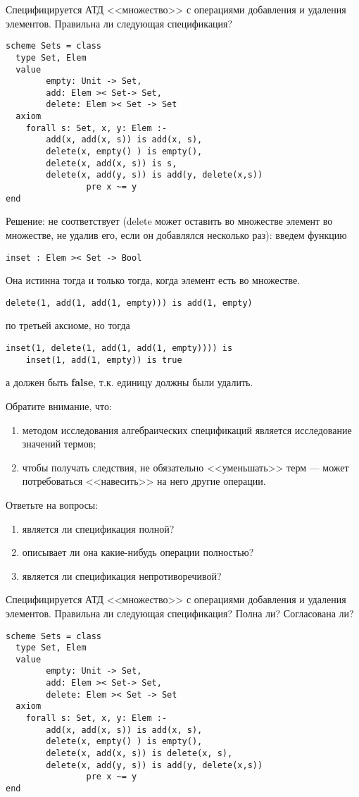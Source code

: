 

\z Специфицируется АТД <<множество>> с операциями добавления и удаления элементов. Правильна ли следующая спецификация?
\begin{lstlisting}
scheme Sets = class
  type Set, Elem
  value
        empty: Unit -> Set,
        add: Elem >< Set-> Set,
        delete: Elem >< Set -> Set
  axiom
    forall s: Set, x, y: Elem :-
        add(x, add(x, s)) is add(x, s),
        delete(x, empty() ) is empty(),
        delete(x, add(x, s)) is s,
        delete(x, add(y, s)) is add(y, delete(x,s))
                pre x ~= y
end
\end{lstlisting}

Решение: не соответствует (delete может оставить во множестве элемент во множестве, не удалив его, если он добавлялся несколько раз): введем функцию
\begin{lstlisting}
inset : Elem >< Set -> Bool
\end{lstlisting}
Она истинна тогда и только тогда, когда элемент есть во множестве.
\begin{lstlisting}
delete(1, add(1, add(1, empty))) is add(1, empty)
\end{lstlisting} по третьей аксиоме, но тогда
\begin{lstlisting}
inset(1, delete(1, add(1, add(1, empty)))) is
    inset(1, add(1, empty)) is true
\end{lstlisting}
а должен быть \textbf{false}, т.к. единицу должны были удалить.

Обратите внимание, что:
\begin{enumerate}
  \item методом исследования алгебраических спецификаций является исследование значений термов;
  \item чтобы получать следствия, не обязательно <<уменьшать>> терм --- может потребоваться <<навесить>> на него другие операции.
\end{enumerate}

Ответьте на вопросы:
\begin{enumerate}
  \item является ли спецификация полной?
  \item описывает ли она какие-нибудь операции полностью?
  \item является ли спецификация непротиворечивой?
\end{enumerate}

\z Специфицируется АТД <<множество>> с операциями добавления и удаления элементов. Правильна ли следующая спецификация? Полна ли? Согласована ли?
\begin{lstlisting}
scheme Sets = class
  type Set, Elem
  value
        empty: Unit -> Set,
        add: Elem >< Set-> Set,
        delete: Elem >< Set -> Set
  axiom
    forall s: Set, x, y: Elem :-
        add(x, add(x, s)) is add(x, s),
        delete(x, empty() ) is empty(),
        delete(x, add(x, s)) is delete(x, s),
        delete(x, add(y, s)) is add(y, delete(x,s))
                pre x ~= y
end
\end{lstlisting}

